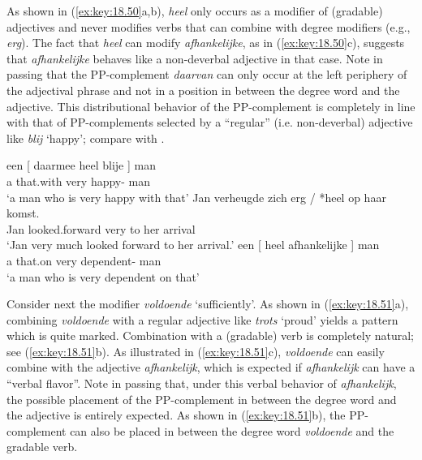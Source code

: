 \documentclass[output=paper]{langsci/langscibook}
\begin{document}
As shown in (\ref{ex:key:18.50}a,b), \emph{heel} only occurs as a modifier of
(gradable) adjectives and never modifies verbs that can combine with degree
modifiers (e.g., \emph{erg}). The fact that \emph{heel} can modify
\emph{afhankelijke}, as in (\ref{ex:key:18.50}c), suggests that \emph{afhankelijke}
behaves like a non-deverbal adjective in that case. Note in passing that the
PP-complement \emph{daarvan} can only occur at the left periphery of the
adjectival phrase and not in a position in between the degree word and the
adjective. This distributional behavior of the PP-complement is completely in
line with that of PP-complements selected by a \enquote{regular} (i.e.
non-deverbal) adjective like \emph{blij} \enquote*{happy}; compare with
.

\ea%
    \label{ex:key:18.50}
	\ea
	\gll een [ daarmee heel blije ] man\\
    a {} that.with very happy-\Agr{} {} man\\
	\glt \enquote*{a man who is very happy with that}
	\ex
    \gll Jan verheugde zich {erg / *heel} op haar komst.\\
        Jan looked.forward \Refl{} very to her arrival\\
	\glt \enquote*{Jan very much looked forward to her arrival.}
	\ex
	\gll een [  heel  afhankelijke ] man\\
        a {} that.on very {} dependent-\Agr{} {} man\\
	\glt \enquote*{a man who is very dependent on that}
	\z
\z

Consider next the modifier \emph{voldoende} \enquote*{sufficiently}. As shown
in (\ref{ex:key:18.51}a), combining \emph{voldoende} with a regular adjective like
\emph{trots} \enquote*{proud} yields a pattern which is quite marked.
Combination with a (gradable) verb is completely natural; see (\ref{ex:key:18.51}b).
As illustrated in (\ref{ex:key:18.51}c), \emph{voldoende} can easily combine with
the adjective \emph{afhankelijk}, which is expected if \emph{afhankelijk} can
have a \enquote{verbal flavor}. Note in passing that, under this verbal
behavior of \emph{afhankelijk}, the possible placement of the PP-complement in
between the degree word and the adjective is entirely expected. As shown in
(\ref{ex:key:18.51}b), the PP-complement can also be placed in between the degree
word \emph{voldoende} and the gradable verb.
\end{document}

